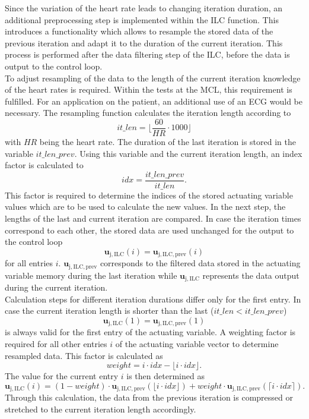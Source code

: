Since the variation of the heart rate leads to changing iteration duration, an additional preprocessing step is implemented within the ILC function. This introduces a functionality which allows to resample the stored data of the previous iteration and adapt it to the duration of the current iteration. This process is performed after the data filtering step of the ILC, before the data is output to the control loop.
\\To adjust resampling of the data to the length of the current iteration knowledge of the heart rates is required. Within the tests at the MCL, this requirement is fulfilled. For an application on the patient, an additional use of an ECG would be necessary.
The resampling function calculates the iteration length according to
\begin{equation}
  it\_len = \lfloor\frac{60}{HR}\cdot1000\rfloor
\end{equation}
with $HR$ being the heart rate. The duration of the last iteration is stored in the variable $it\_len\_prev$. Using this variable and the current iteration length, an index factor is calculated to
\begin{equation}
  idx = \frac{it\_len\_prev}{it\_len}.
\end{equation}
This factor is required to determine the indices of the stored actuating variable values which are to be used to calculate the new values.
In the next step, the lengths of the last and current iteration are compared. In case the iteration times correspond to each other, the stored data are used unchanged for the output to the control loop
\begin{equation}
  \mathbf{u}_{\mathrm{j,ILC}}(i) = \mathbf{u}_{\mathrm{j,ILC,prev}}(i)
\end{equation} for all entries $i$. $\mathbf{u}_{\mathrm{j,ILC,prev}}$ corresponds to the filtered data stored in the actuating variable memory during the last iteration while $\mathbf{u}_{\mathrm{j,ILC}}$ represents the data output during the current iteration.
\\Calculation steps for different iteration durations differ only for the first entry. In case the current iteration length is shorter than the last ($it\_len<it\_len\_prev$)
\begin{equation}
  \mathbf{u}_{\mathrm{j,ILC}}(1) = \mathbf{u}_{\mathrm{j,ILC,prev}}(1)
\end{equation} is always valid for the first entry of the actuating variable.
A weighting factor is required for all other entries $i$ of the actuating variable vector to determine resampled data. This factor is calculated as
\begin{equation}
  weight= i \cdot idx - \lfloor i \cdot idx\rfloor.
\end{equation}
The value for the current entry $i$ is then determined as
\begin{equation}
  \mathbf{u}_{\mathrm{j,ILC}}(i) = (1-weight) \cdot \mathbf{u}_{\mathrm{j,ILC,prev}}(\lfloor i \cdot idx\rfloor) + weight\cdot \mathbf{u}_{\mathrm{j,ILC,prev}}(\lceil i \cdot idx\rceil).
\end{equation}
Through this calculation, the data from the previous iteration is compressed or stretched to the current iteration length accordingly.

